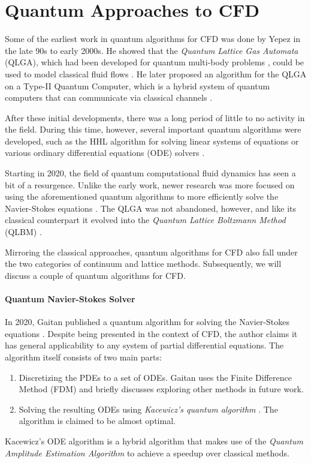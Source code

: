 \section{Quantum Approaches to CFD}
\label{sec:qcfd}

Some of the earliest work in quantum algorithms for CFD was done by Yepez in the late 90s to early 2000s.
He showed that the \emph{Quantum Lattice Gas Automata} (QLGA), which had been developed for quantum multi-body problems \cite{boghosian1997gas}, could be used to model classical fluid flows \cite{yepez1998lattice}.
He later proposed an algorithm for the QLGA on a Type-II Quantum Computer, which is a hybrid system of quantum computers that can communicate via classical channels \cite{yepez2001lattice}.

After these initial developments, there was a long period of little to no activity in the field.
During this time, however, several important quantum algorithms were developed, such as the HHL algorithm for solving linear systems of equations \cite{harrow2009quantum} or various ordinary differential equations (ODE) solvers \cite{kacewicz2006almost}.

Starting in 2020, the field of quantum computational fluid dynamics has seen a bit of a resurgence.
Unlike the early work, newer research was more focused on using the aforementioned quantum algorithms to more efficiently solve the Navier-Stokes equations \cite{gaitan2020finding, jaksch2023variational}.
The QLGA was not abandoned, however, and like its classical counterpart it evolved into the \emph{Quantum Lattice Boltzmann Method} (QLBM) \cite{budinski2021quantum, itani2024quantum}.

Mirroring the classical approaches, quantum algorithms for CFD also fall under the two categories of continuum and lattice methods.
Subsequently, we will discuss a couple of quantum algorithms for CFD.

\paragraph*{Quantum Navier-Stokes Solver}
In 2020, Gaitan published a quantum algorithm for solving the Navier-Stokes equations \cite{gaitan2020finding}.
Despite being presented in the context of CFD, the author claims it has general applicability to any system of partial differential equations.
The algorithm itself consists of two main parts:
\begin{enumerate}
    \item Discretizing the PDEs to a set of ODEs. Gaitan uses the Finite Difference Method (FDM) and briefly discusses exploring other methods in future work.
    \item Solving the resulting ODEs using \emph{Kacewicz's quantum algorithm} \cite{kacewicz2006almost}. The algorithm is claimed to be almost optimal.
\end{enumerate}
Kacewicz's ODE algorithm is a hybrid algorithm that makes use of the \emph{Quantum Amplitude Estimation Algorithm} \cite{brassard2002quantum} to achieve a speedup over classical methods.


